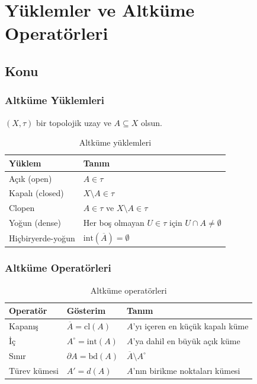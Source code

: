 \chapter{Yüklemler ve Altküme Operatörleri}
\label{ch:predicates_operators}

\section{Konu}

\subsection{Altküme Yüklemleri}

$(X, \tau)$ bir topolojik uzay ve $A \subseteq X$ olsun.

\begin{table}[h]
\centering
\begin{tabular}{ll}
\toprule
\textbf{Yüklem} & \textbf{Tanım} \\
\midrule
Açık (open) & $A \in \tau$ \\
Kapalı (closed) & $X \setminus A \in \tau$ \\
Clopen & $A \in \tau$ ve $X \setminus A \in \tau$ \\
Yoğun (dense) & Her boş olmayan $U \in \tau$ için $U \cap A \neq \emptyset$ \\
Hiçbiryerde-yoğun & $\mathrm{int}(\overline{A}) = \emptyset$ \\
\bottomrule
\end{tabular}
\caption{Altküme yüklemleri}
\end{table}

\subsection{Altküme Operatörleri}

\begin{table}[h]
\centering
\begin{tabular}{lll}
\toprule
\textbf{Operatör} & \textbf{Gösterim} & \textbf{Tanım} \\
\midrule
Kapanış & $\overline{A} = \mathrm{cl}(A)$ & $A$'yı içeren en küçük kapalı küme \\
İç & $A^\circ = \mathrm{int}(A)$ & $A$'ya dahil en büyük açık küme \\
Sınır & $\partial A = \mathrm{bd}(A)$ & $\overline{A} \setminus A^\circ$ \\
Türev kümesi & $A' = d(A)$ & $A$'nın birikme noktaları kümesi \\
\bottomrule
\end{tabular}
\caption{Altküme operatörleri}
\end{table}

